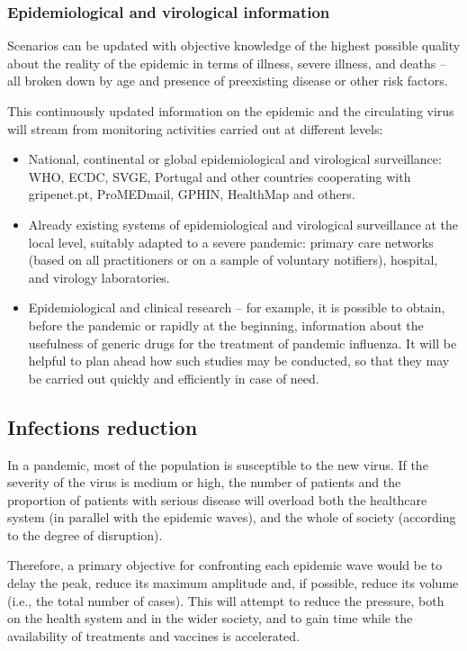 \documentclass[12pt, a4]{scrartcl}
\begin{document}
\subsubsection{Epidemiological and virological information}
Scenarios can be updated with objective knowledge of the highest possible quality about the reality of the epidemic in terms of illness, severe illness, and deaths – all broken down by age and presence of preexisting disease or other risk factors. 

This continuously updated information on the epidemic and the circulating virus will stream from monitoring activities carried out at different levels:

\begin{itemize}
	\item National, continental or global epidemiological and virological surveillance: WHO, ECDC, SVGE, Portugal and other countries cooperating with gripenet.pt, ProMEDmail, GPHIN, HealthMap and others.
	\item Already existing systems of epidemiological and virological surveillance at the local level, suitably adapted to a severe pandemic: primary care networks (based on all practitioners or on a sample of voluntary notifiers), hospital, and virology laboratories.
	\item Epidemiological and clinical research – for example, it is possible to obtain, before the pandemic or rapidly at the beginning, information about the usefulness of generic drugs for the treatment of pandemic influenza. It will be helpful to plan ahead how such studies may be conducted, so that they may be carried out quickly and efficiently in case of need.
\end{itemize}

\subsection{Infections reduction}
In a pandemic, most of the population is susceptible to the new virus. If the severity of the virus is medium or high, the number of patients and the proportion of patients with serious disease will overload both the healthcare system (in parallel with the epidemic waves), and the whole of society (according to the degree of disruption).

Therefore, a primary objective for confronting each epidemic wave would be to delay the peak, reduce its maximum amplitude and, if possible, reduce its volume (i.e., the total number of cases). This will attempt to reduce the pressure, both on the health system and in the wider society, and to gain time while the availability of treatments and vaccines is accelerated.
\end{document}
